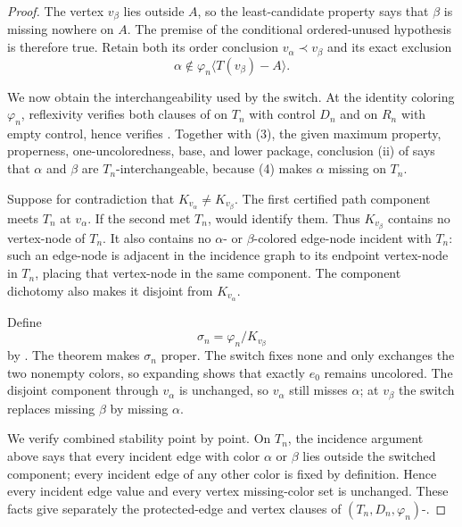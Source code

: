 \begin{proof}
The vertex $v_\beta$ lies outside $A$, so the least-candidate property
says that $\beta$ is missing nowhere on $A$.  The premise of the
conditional ordered-unused hypothesis is therefore true.  Retain both its
order conclusion $v_\alpha\prec v_\beta$ and its exact exclusion
\[
       \alpha\notin\varphi_n\langle T(v_\beta)-A\rangle.        \tag{6}
\]

We now obtain the interchangeability used by the switch.  At the identity
coloring $\varphi_n$, reflexivity verifies both clauses of
 on $T_n$ with control $D_n$ and on $R_n$ with
empty control, hence verifies
.  Together with (3), the given maximum
property, properness, one-uncoloredness, base, and lower package, conclusion
(ii) of  says that $\alpha$ and $\beta$ are
$T_n$-interchangeable, because (4) makes $\alpha$ missing on $T_n$.

Suppose for contradiction that $K_{v_\alpha}\ne K_{v_\beta}$.  The first
certified path component meets $T_n$ at $v_\alpha$.  If the second met
$T_n$,  would identify them.  Thus
$K_{v_\beta}$ contains no vertex-node of $T_n$.  It also contains no
$\alpha$- or $\beta$-colored edge-node incident with $T_n$: such an
edge-node is adjacent in the incidence graph to its endpoint vertex-node
in $T_n$, placing that vertex-node in the same component.  The component
dichotomy  also makes it disjoint from
$K_{v_\alpha}$.

Define
\[
                 \sigma_n=\varphi_n/K_{v_\beta}
\]
by .  The theorem
 makes $\sigma_n$ proper.  The switch
fixes \textsf{none} and only exchanges the two nonempty colors, so expanding
 shows that exactly $e_0$ remains uncolored.
The disjoint component through $v_\alpha$ is unchanged, so $v_\alpha$
still misses $\alpha$; at $v_\beta$ the switch replaces missing $\beta$
by missing $\alpha$.

We verify combined stability point by point.  On $T_n$, the incidence
argument above says that every incident edge with color $\alpha$ or
$\beta$ lies outside the switched component; every incident edge of any
other color is fixed by definition.  Hence every incident edge value and
every vertex missing-color set is unchanged.  These facts give separately
the protected-edge and vertex clauses of
$(T_n,D_n,\varphi_n)$-.


\end{proof}
